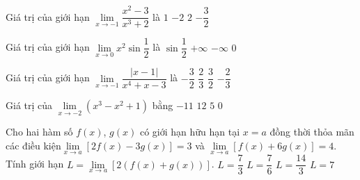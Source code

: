 \begin{ex}%
	Giá trị của giới hạn $\lim\limits_{x\to -1}\dfrac{x^2-3}{x^3+2}$ là 
	 \choice
		 {$1$}
		 {\True $-2$}
		 {$2$}
		 {$-\dfrac{3}{2}$}
\end{ex}

\begin{ex}%
	Giá trị của giới  hạn $\lim\limits_{x\to 0}{x^2}\sin\dfrac{1}{2}$ là
	\choice 
		 {$\sin\dfrac{1}{2}$}
		{$+\infty$} 
		 {$-\infty$}
		 {\True $0$}
\end{ex}

\begin{ex}%
	Giá trị của giới  hạn $\lim\limits_{x\to -1}\dfrac{|x-1|}{x^4+x-3}$ là
	 \choice
		 {$-\dfrac{3}{2}$}
		{$\dfrac{2}{3}$} 
		{$\dfrac{3}{2}$} 
		{\True  $-\dfrac{2}{3}$}
\end{ex}

\begin{ex}%
	Giá trị của $\lim\limits_{x\rightarrow -2} \left(x^3-x^2+1\right)$ bằng 
	 \choice
		 {\True $-11$}
		 {$12$}
		{$5$} 
		{$0$} 
\end{ex}

\begin{ex}%
	Cho hai hàm số $f(x)$, $g(x)$ có giới hạn hữu hạn  tại $x=a$ đồng thời thỏa mãn các điều kiện\break $\lim\limits_{x\to a} [2f(x)-3g(x)]=3$ và $\lim\limits_{x\to a} [f(x)+6g(x)]=4$. Tính giới hạn $L=\lim\limits_{x\to a} [2(f(x)+g(x))]$.
	\choice 
		 {$L=\dfrac{7}{3}$}
		{$L=\dfrac{7}{6}$} 
		{\True  $L=\dfrac{14}{3}$}
		{$L=7$} 
\end{ex}

